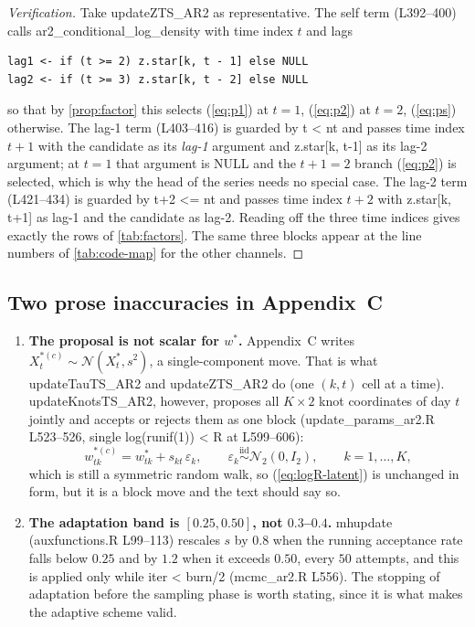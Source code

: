 \documentclass[11pt]{article}
\newcommand{\Norm}{\mathcal{N}}
\DeclareRobustCommand{\code}[1]{\texttt{#1}}
\newcommand{\eref}[1]{(\ref{#1})}
\def\bm#1{#1}%
\def\code#1{#1}%
\theoremstyle{plain}
\theoremstyle{definition}
\theoremstyle{remark}
\begin{document}
\begin{proof}[Verification]
Take \code{updateZTS\_AR2} as representative. The self term (L392--400) calls
\code{ar2\_conditional\_log\_density} with time index $t$ and lags
\begin{lstlisting}
lag1 <- if (t >= 2) z.star[k, t - 1] else NULL
lag2 <- if (t >= 3) z.star[k, t - 2] else NULL
\end{lstlisting}
so that by
\cref{prop:factor} this selects \eref{eq:p1} at $t=1$, \eref{eq:p2} at $t=2$,
\eref{eq:ps} otherwise. The lag-1 term (L403--416) is guarded by
\code{t < nt} and passes time index $t+1$ with the candidate as its
\emph{lag-1} argument and \code{z.star[k, t-1]} as its lag-2 argument; at
$t = 1$ that argument is \code{NULL} and the $t{+}1 = 2$ branch \eref{eq:p2}
is selected, which is why the head of the series needs no special case. The
lag-2 term (L421--434) is guarded by \code{t+2 <= nt} and passes time index
$t+2$ with \code{z.star[k, t+1]} as lag-1 and the candidate as lag-2. Reading
off the three time indices gives exactly the rows of \cref{tab:factors}. The
same three blocks appear at the line numbers of \cref{tab:code-map} for the
other channels.
\end{proof}

\subsection{Two prose inaccuracies in Appendix~C}
\label{sec:layerA-nits}

\begin{enumerate}[label=(A\arabic*), leftmargin=*]
\item \textbf{The proposal is not scalar for $\bm{w}^{*}$.} Appendix~C writes
      $X^{*(c)}_t \sim \Norm(X^{*}_t, s^2)$, a single-component move. That is
      what \code{updateTauTS\_AR2} and \code{updateZTS\_AR2} do (one $(k,t)$
      cell at a time). \code{updateKnotsTS\_AR2}, however, proposes all
      $K \times 2$ knot coordinates of day $t$ jointly and accepts or rejects
      them as one block (\code{update\_params\_ar2.R} L523--526, single
      \code{log(runif(1)) < R} at L599--606):
      \begin{equation}\label{eq:block-move}
        \bm{w}^{*(c)}_{tk} = \bm{w}^{*}_{tk} + s_{kt}\,\bm{\varepsilon}_{k},
        \qquad \bm{\varepsilon}_k \overset{\text{iid}}{\sim} \Norm_2(\bm{0}, \bm{I}_2),
        \qquad k = 1, \dots, K,
      \end{equation}
      which is still a symmetric random walk, so \eref{eq:logR-latent} is
      unchanged in form, but it is a block move and the text should say so.
\item \textbf{The adaptation band is $[0.25, 0.50]$, not $0.3$--$0.4$.}
      \code{mhupdate} (\code{auxfunctions.R} L99--113) rescales $s$ by $0.8$
      when the running acceptance rate falls below $0.25$ and by $1.2$ when it
      exceeds $0.50$, every $50$ attempts, and this is applied only while
      \code{iter < burn/2} (\code{mcmc\_ar2.R} L556). The stopping of
      adaptation before the sampling phase is worth stating, since it is what
      makes the adaptive scheme valid.
\end{enumerate}
\end{document}

